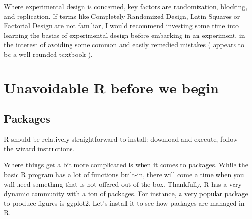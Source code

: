 \documentclass{report}
\newcommand{\code}[1]{\textsf{\ttfamily #1}}
\begin{document}
		Where experimental design is concerned, key factors are randomization, blocking, and replication. If terms like Completely Randomized Design, Latin Squares or Factorial Design are not familiar, I would recommend investing some time into learning the basics of experimental design before embarking in an experiment, in the interest of avoiding some common and easily remedied mistakes (\cite{doe} appears to be a well-rounded textbook ).

\chapter{Unavoidable R before we begin}
	\section{Packages}
	R \cite{R} should be relatively straightforward to install: download and execute, follow the wizard instructions.

	Where things get a bit more complicated is when it comes to packages. While the basic R program has a lot of functions built-in, there will come a time when you will need something that is not offered out of the box. Thankfully, R has a very dynamic community with a ton of packages. For instance, a very popular package to produce figures is \code{ggplot2}. Let's install it to see how packages are managed in R.
\end{document}
